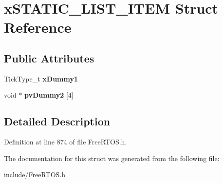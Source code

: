 \hypertarget{structxSTATIC__LIST__ITEM}{}\section{x\+S\+T\+A\+T\+I\+C\+\_\+\+L\+I\+S\+T\+\_\+\+I\+T\+EM Struct Reference}
\label{structxSTATIC__LIST__ITEM}
\subsection*{Public Attributes}
\begin{DoxyCompactItemize}
\item 
\mbox{\label{structxSTATIC__LIST__ITEM_abdb8e415f1bcfbba19fbf57d8d4e9438}} 
Tick\+Type\+\_\+t {\bfseries x\+Dummy1}
\item 
\mbox{\label{structxSTATIC__LIST__ITEM_a53c6cb2b8094f991254635d04c9be55b}} 
void $\ast$ {\bfseries pv\+Dummy2} \mbox{[}4\mbox{]}
\end{DoxyCompactItemize}


\subsection{Detailed Description}


Definition at line 874 of file Free\+R\+T\+O\+S.\+h.



The documentation for this struct was generated from the following file\+:\begin{DoxyCompactItemize}
\item 
include/Free\+R\+T\+O\+S.\+h\end{DoxyCompactItemize}
